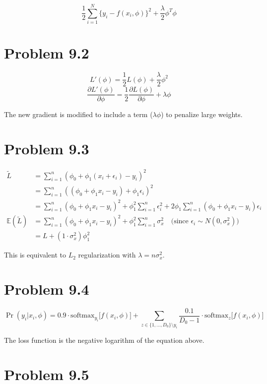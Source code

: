 \documentclass{article}
\begin{document}
\[
\frac{1}{2}\sum_{i=1}^N \{ y_i - f(x_i,\phi)\}^2 + \frac{\lambda}{2} \phi^T\phi
\]

\section*{Problem 9.2}

\[
L'(\phi) = \frac{1}{2} L(\phi) + \frac{\lambda}{2} \phi^2 
\]
\[
\frac{\partial L'(\phi)}{\partial \phi} = \frac{1}{2} \frac{\partial L(\phi)}{\partial \phi} + \lambda \phi
\]

The new gradient is modified to include a term (\(\lambda \phi\)) to penalize large weights.

\section*{Problem 9.3}

\[
\begin{aligned}
\tilde{L} &= \sum_{i=1}^n \left( \phi_0 + \phi_1 (x_i + \epsilon_i) - y_i \right)^2  \\
&= \sum_{i=1}^n \left( (\phi_0 + \phi_1 x_i - y_i) + \phi_1 \epsilon_i \right)^2 \\
&= \sum_{i=1}^n \left( \phi_0 + \phi_1 x_i - y_i \right)^2 + \phi_1^2\sum_{i=1}^n \epsilon_i^2 + 2\phi_1 \sum_{i=1}^n (\phi_0 + \phi_1 x_i - y_i) \epsilon_i \\ 
\mathbb{E}(\tilde{L}) &= \sum_{i=1}^n \left( \phi_0 + \phi_1 x_i - y_i \right)^2 + \phi_1^2 \sum_{i=1}^n \sigma_x^2 \quad \text{(since \(\epsilon_i \sim N(0, \sigma_x^2)\))} \\
&= L + ( 1 \cdot \sigma_x^2 ) \phi_1^2 
\end{aligned}
\]

This is equivalent to \(L_2\) regularization with \(\lambda = n\sigma_x^2\).

\section*{Problem 9.4}

\[
\Pr(y_i | x_i, \phi) = 0.9 \cdot \text{softmax}_{y_i} \big[f(x_i, \phi)\big] + 
\sum_{z \in \{1, \dots, D_0\} \setminus y_i} 
\frac{0.1}{D_0 - 1} \cdot \text{softmax}_{z} \big[f(x_i, \phi)\big]
\]

The loss function is the negative logarithm of the equation above.

\section*{Problem 9.5}
\end{document}
